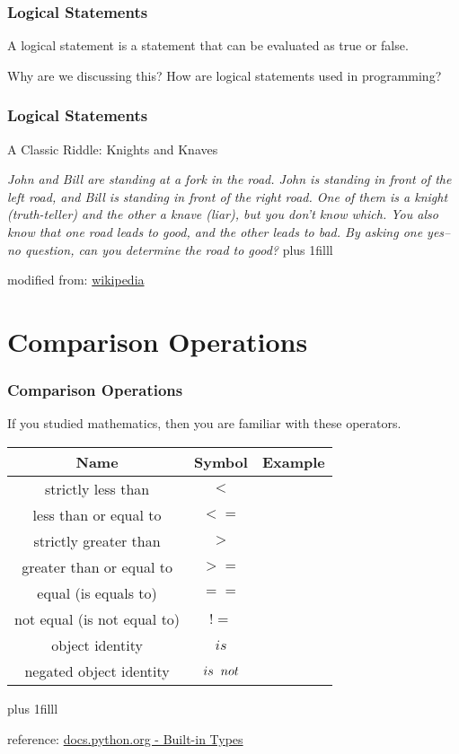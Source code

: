 \documentclass[fleqn]{beamer} %
\newcommand{\sectiontitleI}{Logical Statements} %
\newcommand{\sectiontitleII}{Comparison Operations}
\newcommand{\btVFill}{\vskip0pt plus 1filll}
\begin{document}
	\begin{frame}[label=sectionII,containsverbatim] \small
		\frametitle{\sectiontitleI}
		
A {\PR logical statement} is a statement that can be evaluated as {\GR true} or {\RD false}. \vspcc

Why are we discussing this? How are logical statements used in programming? \vspcc

	\end{frame}

	\begin{frame} \small
		\frametitle{\sectiontitleI}
		
		A Classic Riddle: Knights and Knaves \vspccc
		
		{\it John and Bill are standing at a fork in the road. John is standing in front of the left road, and Bill is standing in front of the right road. One of them is a knight (truth-teller) and the other a knave (liar), but you don't know which. You also know that one road leads to good, and the other leads to bad. By asking one yes–no question, can you determine the road to good?} 
		\btVFill
		
		\tiny{modified from: \href{https://en.wikipedia.org/wiki/Knights_and_Knaves}{wikipedia} } 	

	\end{frame}	

\section{\sectiontitleII}

	\begin{frame}[label=sectionII,containsverbatim] \small
	\frametitle{\sectiontitleII}
	
	If you studied mathematics, then you are familiar with these operators.  \\
			
		\renewcommand*{\arraystretch}{1.5}
		\begin{tabular}{c|c|c} 
			Name&Symbol&Example\\ \hline
			strictly less than&$<$ & \\ \hline
			less than or equal to&$<=$ & \\ \hline
			strictly greater than&$>$ & \\ \hline
			greater than or equal to&$>=$ & \\ \hline
			equal (is equals to)&$==$ & \\ \hline
			not equal (is not equal to)&$!=$ & \\ \hline
			object identity&$is$ & \\ \hline
			negated object identity&$is\hspace{2mm}not$& \\ \hline
		\end{tabular}
		
	
	\btVFill
	
	\tiny{reference: \href{https://docs.python.org/3/library/stdtypes.html}{docs.python.org - Built-in Types} } 	
	
	\end{frame}      
\end{document}
